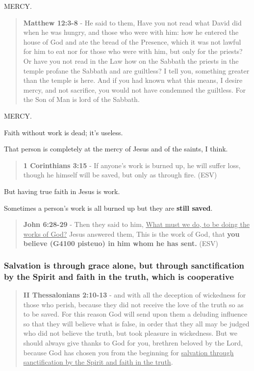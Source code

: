 \documentclass[11pt]{article}
\begin{document}
MERCY.

\begin{quote}
\textbf{Matthew 12:3-8} - He said to them, Have you not read what David did when he was hungry, and those who were with him: how he entered the house of God and ate the bread of the Presence, which it was not lawful for him to eat nor for those who were with him, but only for the priests? Or have you not read in the Law how on the Sabbath the priests in the temple profane the Sabbath and are guiltless? I tell you, something greater than the temple is here. And if you had known what this means, I desire mercy, and not sacrifice, you would not have condemned the guiltless. For the Son of Man is lord of the Sabbath.
\end{quote}

MERCY.

Faith without work is dead; it's useless.

That person is completely at the mercy of Jesus and of the saints, I think.

\begin{quote}
\textbf{1 Corinthians 3:15} - If anyone's work is burned up, he will suffer loss, though he himself will be saved, but only as through fire. (ESV)
\end{quote}

But having true faith in Jesus is work.

Sometimes a person's work is all burned up but they are \textbf{still saved}.

\begin{quote}
\textbf{John 6:28-29} - Then they said to him, \uline{What must we do, to be doing the works of God?} Jesus answered them, This is the work of God, that \textbf{you believe (G4100 pisteuo) in him whom he has sent.} (ESV)
\end{quote}

\subsubsection{Salvation is through grace alone, but through sanctification by the Spirit and faith in the truth, which is cooperative}
\label{sec:org388121b}

\begin{quote}
\textbf{II Thessalonians 2:10-13} - and with all the deception of wickedness for those who perish, because they did not receive the love of the truth so as to be saved. For this reason God will send upon them a deluding influence so that they will believe what is false, in order that they all may be judged who did not believe the truth, but took pleasure in wickedness. But we should always give thanks to God for you, brethren beloved by the Lord, because God has chosen you from the beginning for \uline{salvation through sanctification by the Spirit and faith in the truth}.
\end{quote}
\end{document}
